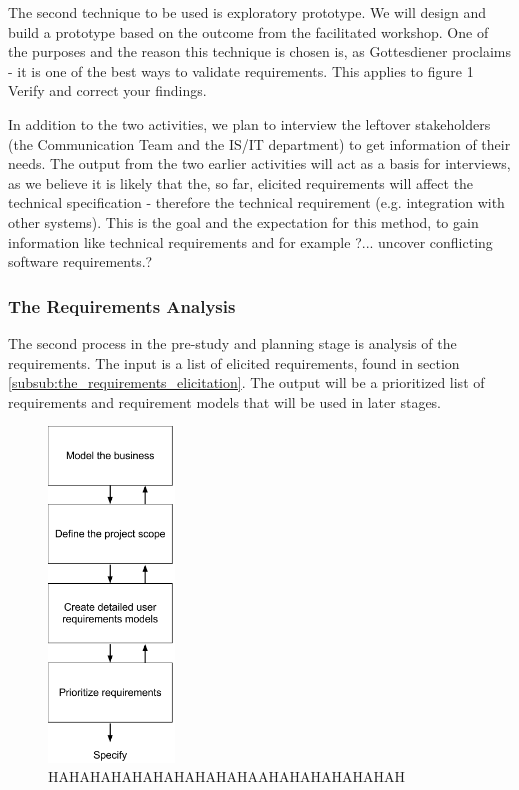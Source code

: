 \documentclass[a4paper]{article}
\begin{document}
The second technique to be used is exploratory prototype. We will design and build a prototype based on the outcome from the facilitated workshop. One of the purposes and the reason this technique is chosen is, as Gottesdiener proclaims \cite{gott77} - it is one of the best ways to validate requirements. This applies to figure 1 Verify and correct your findings. 

In addition to the two activities, we plan to interview the leftover stakeholders (the Communication Team and the IS/IT department) to get information of their needs. The output from the two earlier activities will act as a basis for interviews, as we believe it is likely that the, so far, elicited requirements will affect the technical specification - therefore the technical requirement (e.g. integration with other systems). This is the goal and the expectation for this method, to gain information like technical requirements and for example ?... uncover conflicting software requirements.? \cite{gott65}

\subsubsection{The Requirements Analysis}
\label{subsub:the_requirements_analysis}
The second process in the pre-study and planning stage is analysis of the requirements. The input is a list of elicited requirements, found in section \ref{subsub:the_requirements_elicitation}. The output will be a prioritized list of requirements and requirement models that will be used in later stages.

\begin{figure}[!ht]
	\centering
		\includegraphics[width=0.3\textwidth]{images/analysis_model.png}
	\caption{HAHAHAHAHAHAHAHAHAHAAHAHAHAHAHAHAH}
	\label{figure:analysis}
\end{figure}
\end{document}
